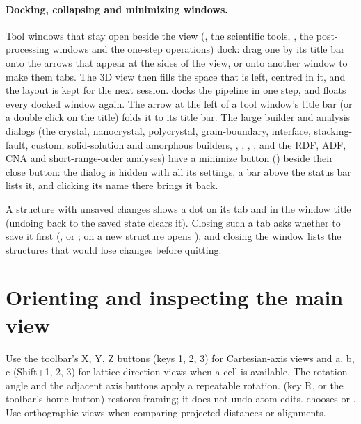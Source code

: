 \paragraph{Docking, collapsing and minimizing windows.} Tool windows that stay open beside the view (, the scientific tools, , the post-processing windows and the one-step operations) dock: drag one by its title bar onto the arrows that appear at the sides of the view, or onto another window to make them tabs. The 3D view then fills the space that is left, centred in it, and the layout is kept for the next session.  docks the pipeline in one step, and  floats every docked window again. The arrow at the left of a tool window's title bar (or a double click on the title) folds it to its title bar. The large builder and analysis dialogs (the crystal, nanocrystal, polycrystal, grain-boundary, interface, stacking-fault, custom, solid-solution and amorphous builders, , , , , and the RDF, ADF, CNA and short-range-order analyses) have a minimize button (\textendash) beside their close button: the dialog is hidden with all its settings, a bar above the status bar lists it, and clicking its name there brings it back.

A structure with unsaved changes shows a dot on its tab and in the window title (undoing back to the saved state clears it). Closing such a tab asks whether to save it first (,  or ;  on a new structure opens ), and closing the window lists the structures that would lose changes before quitting.

\section{Orienting and inspecting the main view}
Use the toolbar's X, Y, Z buttons (keys 1, 2, 3) for Cartesian-axis views and a, b, c (Shift+1, 2, 3) for lattice-direction views when a cell is available. The rotation angle and the adjacent axis buttons apply a repeatable rotation.  (key R, or the toolbar's home button) restores framing; it does not undo atom edits.  chooses  or . Use orthographic views when comparing projected distances or alignments.

